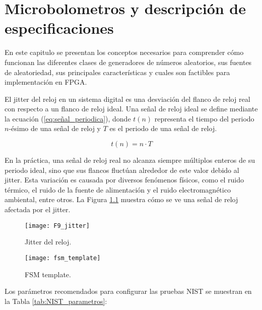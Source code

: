 \chapter{Microbolometros y descripción de especificaciones}

    En este capitulo se presentan los conceptos necesarios para comprender cómo funcionan las diferentes clases de generadores de números aleatorios, sus fuentes de aleatoriedad, sus principales características y cuales son factibles para implementación en FPGA.


El jitter del reloj en un sistema digital es una desviación del flanco de reloj real con respecto a un flanco de reloj ideal. Una señal de reloj ideal se define mediante la ecuación (\ref{eq:señal_periodica}), donde $t(n)$ representa el tiempo del periodo $n$-ésimo de una señal de reloj y $T$ es el periodo de una señal de reloj.

            \begin{equation}
                t(n) = n \cdot T 
                \label{eq:señal_periodica}
            \end{equation}
            
            En la práctica, una señal de reloj real no alcanza siempre múltiplos enteros de su periodo ideal, sino que sus flancos fluctúan alrededor de este valor debido al jitter. Esta variación es causada por diversos fenómenos físicos, como el ruido térmico, el ruido de la fuente de alimentación y el ruido electromagnético ambiental, entre otros. La Figura \ref{fig:F9_jitter} muestra cómo se ve una señal de reloj afectada por el jitter.

            \begin{figure}[hbtp]
                \centering
                \texttt{[image: F9\_jitter]}
                \caption{Jitter del reloj.}
                \label{fig:F9_jitter}
            \end{figure}
            
            
            \begin{figure}[hbtp]
                \centering
                \texttt{[image: fsm\_template]}
                \caption{FSM template.}
                \label{fig:fsm_template}
            \end{figure}
            

            
            
            Los parámetros recomendados para configurar las pruebas NIST se muestran en la Tabla \ref{tab:NIST_parametros}:

